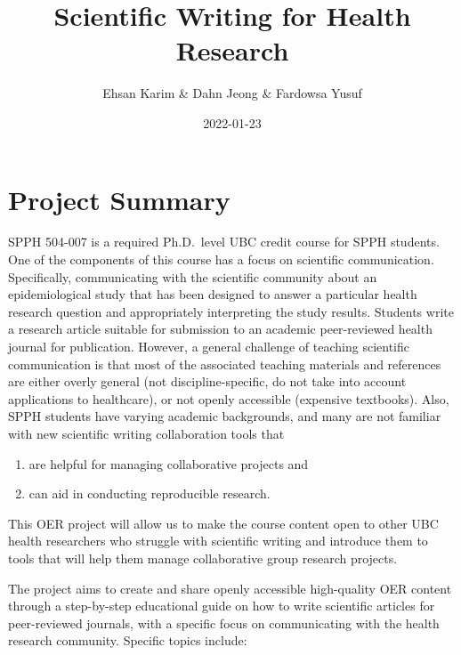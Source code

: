 \documentclass[
]{book}
\title{Scientific Writing for Health Research}
\author{Ehsan Karim \& Dahn Jeong \& Fardowsa Yusuf}
\date{2022-01-23}
\providecommand{\tightlist}{%
  \setlength{\itemsep}{0pt}\setlength{\parskip}{0pt}}
\begin{document}
\maketitle

{
\setcounter{tocdepth}{1}
\tableofcontents
}
\newenvironment{blackbox}{
  \definecolor{shadecolor}{rgb}{0, 0, 0}  %
  \color{white}
  \begin{shaded}}
 {\end{shaded}}

\hypertarget{project-summary}{%
\chapter*{Project Summary}\label{project-summary}}

SPPH 504-007 is a required Ph.D.~level UBC credit course for SPPH students. One of the components of this course has a focus on scientific communication. Specifically, communicating with the scientific community about an epidemiological study that has been designed to answer a particular health research question and appropriately interpreting the study results. Students write a research article suitable for submission to an academic peer-reviewed health journal for publication. However, a general challenge of teaching scientific communication is that most of the associated teaching materials and references are either overly general (not discipline-specific, do not take into account applications to healthcare), or not openly accessible (expensive textbooks). Also, SPPH students have varying academic backgrounds, and many are not familiar with new scientific writing collaboration tools that

\begin{enumerate}
\def\labelenumi{(\roman{enumi})}
\tightlist
\item
  are helpful for managing collaborative projects and
\item
  can aid in conducting reproducible research.
\end{enumerate}

This OER project will allow us to make the course content open to other UBC health researchers who struggle with scientific writing and introduce them to tools that will help them manage collaborative group research projects.

The project aims to create and share openly accessible high-quality OER content through a step-by-step educational guide on how to write scientific articles for peer-reviewed journals, with a specific focus on communicating with the health research community. Specific topics include:
\end{document}
